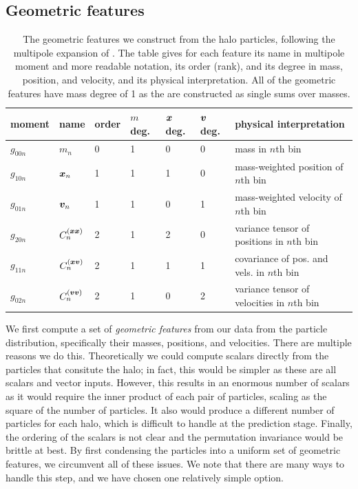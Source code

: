 \subsection{Geometric features}
\label{sec:geometric_features}

\begin{table}
    \caption{The geometric features we construct from the \dark halo particles, following the multipole expansion of . The table gives for each feature its name in multipole moment and more readable notation, its order (rank), and its degree in mass, position, and velocity, and its physical interpretation. All of the geometric features have mass degree of 1 as the are constructed as single sums over masses.}
    \label{tab:geos}
    \vspace{0.5em}
    \centering
    \begin{tabular}{|l|l|l|l|l|l|l|}
    \hline
    moment & name & order & $m$ deg. & $\bm{x}$ deg. & $\bm{v}$ deg. & physical interpretation \\
    \hline
    $g_{00n}$ & $m_n$ & 0 & 1 & 0 & 0 & mass in $n$th bin \\
    $g_{10n}$ & $\bm{x}_n$ & 1 & 1 & 1 & 0 & mass-weighted position of $n$th bin \\
    $g_{01n}$ & $\bm{v}_n$ & 1 & 1 & 0 & 1 & mass-weighted velocity of $n$th bin \\
    $g_{20n}$ & $C^{(\bm{x}\bm{x})}_n$ & 2 & 1 & 2 & 0 & variance tensor of positions in $n$th bin \\
    $g_{11n}$ & $C^{(\bm{x}\bm{v})}_n$ & 2 & 1 & 1 & 1 & covariance of pos. and vels. in $n$th bin \\
    $g_{02n}$ & $C^{(\bm{v}\bm{v})}_n$ & 2 & 1 & 0 & 2 & variance tensor of velocities in $n$th bin \\
    \hline
    \end{tabular}
\end{table}

We first compute a set of \emph{geometric features} from our data from the particle distribution, specifically their masses, positions, and velocities. 
There are multiple reasons we do this.
Theoretically we could compute scalars directly from the particles that consitute the halo; in fact, this would be simpler as these are all scalars and vector inputs.
However, this results in an enormous number of scalars as it would require the inner product of each pair of particles, scaling as the square of the number of particles.
It also would produce a different number of particles for each halo, which is difficult to handle at the prediction stage.
Finally, the ordering of the scalars is not clear and the permutation invariance would be brittle at best.
By first condensing the particles into a uniform set of geometric features, we circumvent all of these issues.
We note that there are many ways to handle this step, and we have chosen one relatively simple option.


